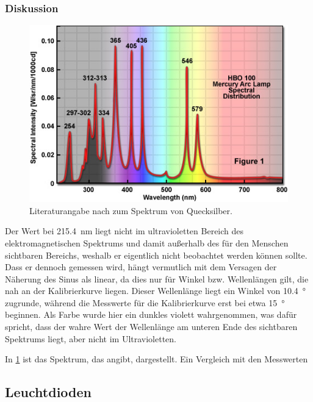 \documentclass[
	a4paper,
	12pt,
	pagesize,
	ngerman
]{scrartcl}
\begin{document}
	\subsubsection{Diskussion}
	\begin{figure}[H] 
		\includegraphics[width=1\textwidth]{fig_quecksilber_lit}
		\centering
		\caption{Literaturangabe nach \cite{Quecksilber} zum Spektrum von Quecksilber.}
		\label{fig_quecksilber}
		\centering
	\end{figure}

	Der Wert bei \SI{215,4}{\nano \meter} liegt nicht im ultravioletten Bereich des elektromagnetischen Spektrums und damit außerhalb des für den Menschen sichtbaren Bereichs, weshalb er eigentlich nicht beobachtet werden können sollte.
	Dass er dennoch gemessen wird, hängt vermutlich mit dem Versagen der Näherung des Sinus als linear, da dies nur für Winkel bzw. Wellenlängen gilt, die nah an der Kalibrierkurve liegen.
	Dieser Wellenlänge liegt ein Winkel von \SI{10,4}{\degree} zugrunde, während die Messwerte für die Kalibrierkurve erst bei etwa \SI{15}{\degree} beginnen.
	Als Farbe wurde hier ein dunkles violett wahrgenommen, was dafür spricht, dass der wahre Wert der Wellenlänge am unteren Ende des sichtbaren Spektrums liegt, aber nicht im Ultravioletten.
	
	In \cref{fig_quecksilber} ist das Spektrum, das \cite{Quecksilber} angibt, dargestellt. Ein Vergleich mit den Messwerten
	
	\subsection{Leuchtdioden}
\end{document}
